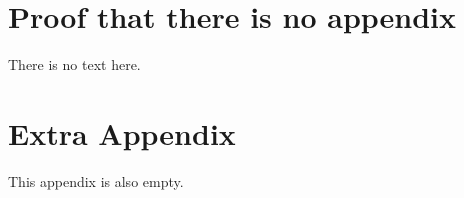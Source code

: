
\appendices
\section{Proof that there is no appendix}
There is no text here.

\section{Extra Appendix}
This appendix is also empty.


%
